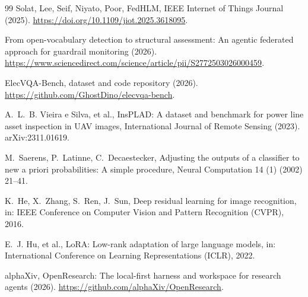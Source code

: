 \documentclass[preprint,12pt]{elsarticle}
\begin{document}
\begin{thebibliography}{99}
 Solat, Lee, Seif, Niyato, Poor, FedHLM, IEEE Internet of Things Journal (2025). \url{https://doi.org/10.1109/jiot.2025.3618095}.

 From open-vocabulary detection to structural assessment: An agentic federated approach for guardrail monitoring (2026). \url{https://www.sciencedirect.com/science/article/pii/S2772503026000459}.

 ElecVQA-Bench, dataset and code repository (2026). \url{https://github.com/GhostDino/elecvqa-bench}.

 A.~L.~B. Vieira e Silva, et al., InsPLAD: A dataset and benchmark for power line asset inspection in UAV images, International Journal of Remote Sensing (2023). arXiv:2311.01619.

 M.~Saerens, P.~Latinne, C.~Decaestecker, Adjusting the outputs of a classifier to new a priori probabilities: A simple procedure, Neural Computation 14 (1) (2002) 21--41.

 K.~He, X.~Zhang, S.~Ren, J.~Sun, Deep residual learning for image recognition, in: IEEE Conference on Computer Vision and Pattern Recognition (CVPR), 2016.

 E.~J. Hu, et al., LoRA: Low-rank adaptation of large language models, in: International Conference on Learning Representations (ICLR), 2022.

 alphaXiv, OpenResearch: The local-first harness and workspace for research agents (2026). \url{https://github.com/alphaXiv/OpenResearch}.

\end{thebibliography}
\end{document}
